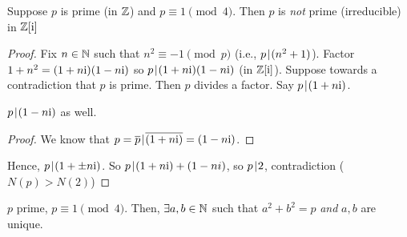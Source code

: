\documentclass[notes.tex]{subfiles}
\begin{document}
	\begin{proposition}
		Suppose $p$ is prime (in $\mathbb{Z}$) and $p\equiv 1\pmod 4$. Then $p$ is \emph{not} prime (irreducible) in $\mathbb{Z}[\mathrm{i}]$
	\end{proposition}
	\begin{proof}
		Fix $n\in\mathbb{N}$ such that $n^2 \equiv -1\pmod p$ (i.e., $p\mkern2mu|\mkern1mu (n^2 + 1)$). Factor $1+n^2 = (1+n\mathrm{i})(1-n\mathrm{i}) $ so $p\mkern2mu|\mkern1mu (1+n\mathrm{i})(1-n\mathrm{i})$ (in $\mathbb{Z}[\mathrm{i}]$).
		Suppose towards a contradiction that $p$ is prime. Then $p$ divides a factor. Say $p\mkern2mu|\mkern1mu(1+n\mathrm{i})$.
		\begin{claim}
			$p\mkern2mu|\mkern1mu (1-n\mathrm{i})$ as well.
		\end{claim}
		\begin{proof}
			We know that $p = \overline{p} \mkern2mu|\mkern1mu \overline{(1+n\mathrm{i})} = (1-n\mathrm{i})$. 
		\end{proof}

		Hence, $p\mkern2mu|\mkern1mu (1+\pm n\mathrm{i})$. So $p\mkern2mu|\mkern1mu (1+n\mathrm{i}) + (1-ni)$, so $p\mkern2mu|\mkern1mu 2$, contradiction ($N(p) > N(2)$)
	\end{proof}

	\begin{theorem}[Fermat]
		$p$ prime, $p\equiv 1\pmod 4$. Then, $\exists a, b\in\mathbb{N}$ such that $a^2 + b^2 = p$ \emph{and} $a, b$ are unique.	
	\end{theorem}
\end{document}
